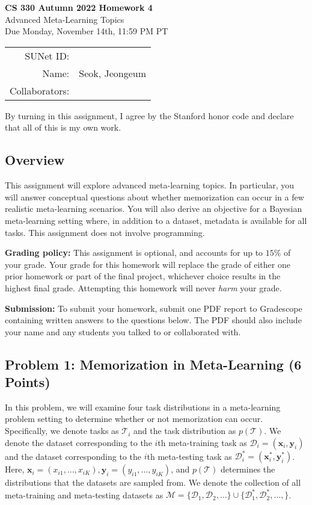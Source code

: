 \documentclass[12pt]{article}
\begin{document}
\begin{center}
{\Large \textbf{CS 330 Autumn 2022 Homework 4} \\ 
Advanced Meta-Learning Topics
\\ 
\vspace{0.2cm}
Due Monday, November 14th, 11:59 PM PT}

\begin{tabular}{rl}
SUNet ID: &  \\
Name: & Seok, Jeongeum\\
Collaborators: & 
\end{tabular}
\end{center}

By turning in this assignment, I agree by the Stanford honor code and declare that all of this is my own work.

\subsection*{Overview}
This assignment will explore advanced meta-learning topics.
In particular, you will answer conceptual questions about whether memorization can occur in a few realistic meta-learning scenarios.
You will also derive an objective for a Bayesian meta-learning setting where, in addition to a dataset, metadata is available for all tasks.
This assignment does not involve programming.

\textbf{Grading policy:} This assignment is optional, and accounts for up to $15\%$ of your grade. Your grade for this homework will replace the grade of either one prior homework or part of the final project, whichever choice results in the highest final grade. Attempting this homework will never \textit{harm} your grade.

\textbf{Submission:} To submit your homework, submit one PDF report to Gradescope containing written answers to the questions below. The PDF should also include your name and any students you talked to or collaborated with.


\subsection*{Problem 1: Memorization in Meta-Learning (6 Points)}
In this problem, we will examine four task distributions in a meta-learning problem setting to determine whether or not memorization can occur.
Specifically, we denote tasks as $\mathcal{T}_i$ and the task distribution as $p(\mathcal{T})$.
We denote the dataset corresponding to the $i$th meta-training task as $\mathcal{D}_i=\left(\boldsymbol{x}_i, \boldsymbol{y}_i\right)$ and the dataset corresponding to the $i$th meta-testing task as $\mathcal{D}_i^*=\left(\boldsymbol{x}_i^*, \boldsymbol{y}_i^*\right)$.
Here, $\boldsymbol{x}_i=\left(x_{i 1}, \ldots, x_{i K}\right), \boldsymbol{y}_i=\left(y_{i 1}, \ldots, y_{i K}\right)$, and $p(\mathcal{T})$ determines the distributions that the datasets are sampled from.
We denote the collection of all meta-training and meta-testing datasets as $\mathcal{M}=\{\mathcal{D}_1, \mathcal{D}_2, \ldots\} \cup \{\mathcal{D}_1^*, \mathcal{D}^*_2, \ldots, \}$.
\end{document}
